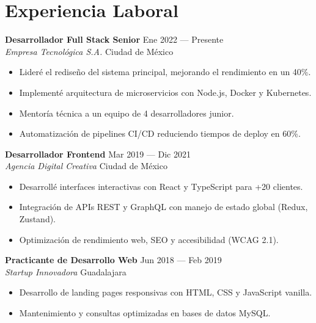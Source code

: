 \documentclass[11pt,a4paper]{article}
\newcommand{\cventry}[4]{%
  \textbf{\color{darktext}#1} \hfill {\small\color{graytext}#2} \\
  {\color{accent}\textit{#3}} \hfill {\small\color{graytext}#4}
  \vspace{4pt}
}
\begin{document}
\section{\faBriefcase\hspace{6pt}Experiencia Laboral}

\cventry{Desarrollador Full Stack Senior}{Ene 2022 --- Presente}{Empresa Tecnológica S.A.}{Ciudad de México}
\begin{itemize}[leftmargin=14pt, itemsep=1pt, topsep=0pt]
  \item Lideré el rediseño del sistema principal, mejorando el rendimiento en un 40\%.
  \item Implementé arquitectura de microservicios con Node.js, Docker y Kubernetes.
  \item Mentoría técnica a un equipo de 4 desarrolladores junior.
  \item Automatización de pipelines CI/CD reduciendo tiempos de deploy en 60\%.
\end{itemize}
\vspace{8pt}

\cventry{Desarrollador Frontend}{Mar 2019 --- Dic 2021}{Agencia Digital Creativa}{Ciudad de México}
\begin{itemize}[leftmargin=14pt, itemsep=1pt, topsep=0pt]
  \item Desarrollé interfaces interactivas con React y TypeScript para +20 clientes.
  \item Integración de APIs REST y GraphQL con manejo de estado global (Redux, Zustand).
  \item Optimización de rendimiento web, SEO y accesibilidad (WCAG 2.1).
\end{itemize}
\vspace{8pt}

\cventry{Practicante de Desarrollo Web}{Jun 2018 --- Feb 2019}{Startup Innovadora}{Guadalajara}
\begin{itemize}[leftmargin=14pt, itemsep=1pt, topsep=0pt]
  \item Desarrollo de landing pages responsivas con HTML, CSS y JavaScript vanilla.
  \item Mantenimiento y consultas optimizadas en bases de datos MySQL.
\end{itemize}

\end{document}
